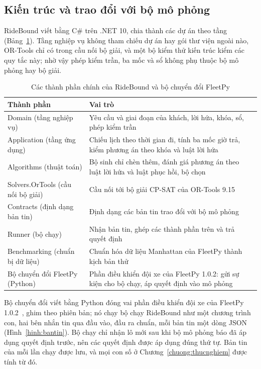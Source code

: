 \subsection{Kiến trúc và trao đổi với bộ mô phỏng}
\label{muc:kientruc}

RideBound viết bằng C\# trên .NET 10, chia thành các dự án theo tầng (Bảng~\ref{bang:kientruc}). Tầng nghiệp vụ
không tham chiếu dự án hay gói thư viện ngoài nào, OR-Tools chỉ có trong cầu nối bộ giải, và một bộ kiểm thử kiến
trúc kiểm các quy tắc này; nhờ vậy phép kiểm trần, ba mốc và sổ không phụ thuộc bộ mô phỏng hay bộ giải.

\begin{table}[htbp]
\centering
\caption[Các thành phần chính của RideBound và bộ chuyển đổi FleetPy]{Các thành phần chính của RideBound và bộ chuyển đổi FleetPy}
\label{bang:kientruc}
\small
\begin{tabular}{@{}p{4.6cm}p{10.2cm}@{}}
\toprule
\textbf{Thành phần} & \textbf{Vai trò}\\
\midrule
Domain (tầng nghiệp vụ) & Yêu cầu và giai đoạn của khách, lời hứa, khóa, sổ, phép kiểm trần\\
Application (tầng ứng dụng) & Chiếu lịch theo thời gian đi, tính ba mốc giờ trả, kiểm phương án theo khóa và luật
lời hứa\\
Algorithms (thuật toán) & Bộ sinh chỉ chèn thêm, đánh giá phương án theo luật lời hứa và luật phục hồi, bộ chọn\\
Solvers.OrTools (cầu nối bộ giải) & Cầu nối tới bộ giải CP-SAT của OR-Tools 9.15\\
Contracts (định dạng bản tin) & Định dạng các bản tin trao đổi với bộ mô phỏng\\
Runner (bộ chạy) & Nhận bản tin, ghép các thành phần trên và trả quyết định\\
Benchmarking (chuẩn bị dữ liệu) & Chuẩn hóa dữ liệu Manhattan của FleetPy thành kịch bản thử\\
Bộ chuyển đổi FleetPy (Python) & Phần điều khiển đội xe của FleetPy 1.0.2: gửi sự kiện cho bộ chạy, áp quyết định
vào mô phỏng\\
\bottomrule
\end{tabular}
\end{table}

Bộ chuyển đổi viết bằng Python đóng vai phần điều khiển đội xe của FleetPy 1.0.2~\cite{engelhardt2026}, ghim theo
phiên bản; nó chạy bộ chạy RideBound như một chương trình con, hai bên nhắn tin qua đầu vào, đầu ra chuẩn, mỗi bản
tin một dòng JSON (Hình~\ref{hinh:bantin}). Bộ chạy chỉ nhận lô mới sau khi bộ mô phỏng báo đã áp dụng quyết định
trước, nên các quyết định được áp dụng đúng thứ tự. Bản tin của mỗi lần chạy được lưu, và mọi con số ở
Chương~\ref{chuong:thucnghiem} được tính từ đó.

